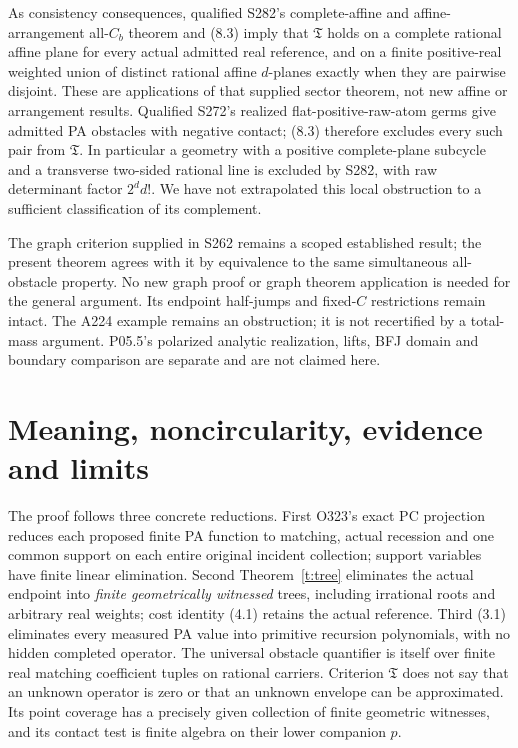 \documentclass[11pt]{article}
\begin{document}
As consistency consequences, qualified S282's complete-affine and affine-arrangement all-$C_b$ theorem and (8.3) imply that $\mathfrak T$ holds on a complete rational affine plane for every actual admitted real reference, and on a finite positive-real weighted union of distinct rational affine $d$-planes exactly when they are pairwise disjoint. These are applications of that supplied sector theorem, not new affine or arrangement results. Qualified S272's realized flat-positive-raw-atom germs give admitted PA obstacles with negative contact; (8.3) therefore excludes every such pair from $\mathfrak T$. In particular a geometry with a positive complete-plane subcycle and a transverse two-sided rational line is excluded by S282, with raw determinant factor $2^d d!$. We have not extrapolated this local obstruction to a sufficient classification of its complement.

The graph criterion supplied in S262 remains a scoped established result; the present theorem agrees with it by equivalence to the same simultaneous all-obstacle property. No new graph proof or graph theorem application is needed for the general argument. Its endpoint half-jumps and fixed-$C$ restrictions remain intact. The A224 example remains an obstruction; it is not recertified by a total-mass argument. P05.5's polarized analytic realization, lifts, BFJ domain and boundary comparison are separate and are not claimed here.

\section{Meaning, noncircularity, evidence and limits}
The proof follows three concrete reductions. First O323's exact PC projection reduces each proposed finite PA function to matching, actual recession and one common support on each entire original incident collection; support variables have finite linear elimination. Second Theorem~\ref{t:tree} eliminates the actual endpoint into \emph{finite geometrically witnessed} trees, including irrational roots and arbitrary real weights; cost identity (4.1) retains the actual reference. Third (3.1) eliminates every measured PA value into primitive recursion polynomials, with no hidden completed operator. The universal obstacle quantifier is itself over finite real matching coefficient tuples on rational carriers. Criterion $\mathfrak T$ does not say that an unknown operator is zero or that an unknown envelope can be approximated. Its point coverage has a precisely given collection of finite geometric witnesses, and its contact test is finite algebra on their lower companion $p$.
\end{document}
